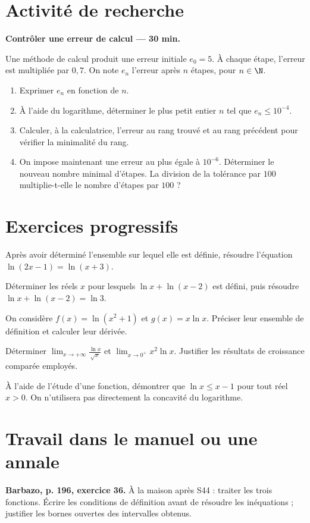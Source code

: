 \section{Activité de recherche}\textbf{Contrôler une erreur de calcul --- 30 min.}\par Une méthode de calcul produit une erreur initiale $e_0=5$. À chaque étape, l'erreur est multipliée par $0{,}7$. On note $e_n$ l'erreur après $n$ étapes, pour $n\in\N$.
\begin{enumerate}\item Exprimer $e_n$ en fonction de $n$.
\item À l'aide du logarithme, déterminer le plus petit entier $n$ tel que $e_n\le10^{-4}$.
\item Calculer, à la calculatrice, l'erreur au rang trouvé et au rang précédent pour vérifier la minimalité du rang.
\item On impose maintenant une erreur au plus égale à $10^{-6}$. Déterminer le nouveau nombre minimal d'étapes. La division de la tolérance par $100$ multiplie-t-elle le nombre d'étapes par $100$ ?\end{enumerate}

\section{Exercices progressifs}

Après avoir déterminé l'ensemble sur lequel elle est définie, résoudre l'équation $\ln(2x-1)=\ln(x+3)$.

Déterminer les réels $x$ pour lesquels $\ln x+\ln(x-2)$ est défini, puis résoudre $\ln x+\ln(x-2)=\ln3$.

On considère $f(x)=\ln(x^2+1)$ et $g(x)=x\ln x$. Préciser leur ensemble de définition et calculer leur dérivée.

Déterminer $\displaystyle\lim_{x\to+\infty}\frac{\ln x}{\sqrt x}$ et $\displaystyle\lim_{x\to0^+}x^2\ln x$. Justifier les résultats de croissance comparée employés.

À l'aide de l'étude d'une fonction, démontrer que $\ln x\le x-1$ pour tout réel $x>0$. On n'utilisera pas directement la concavité du logarithme.

\section{Travail dans le manuel ou une annale}\textbf{Barbazo, p. 196, exercice 36.} À la maison après S44 : traiter les trois fonctions. Écrire les conditions de définition avant de résoudre les inéquations ; justifier les bornes ouvertes des intervalles obtenus.

